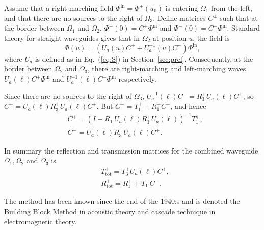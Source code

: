 \documentclass{svjour3}
\renewcommand{\Phi}{\varPhi}
\renewcommand{\vec}[1]{\bm{#1}}
\renewcommand{\Phi}{\varPhi}
\newcommand{\Phiin}{\vec\Phi^{\text{in}}}
\newcommand{\Ttot}{T^+_{\text{tot}}}
\newcommand{\Rtot}{R^+_{\text{tot}}}
\begin{document}
Assume that a right-marching field $\Phiin=\vec\Phi^+(u_0)$ is
entering $\Omega_1$ from the left, and that there are no sources to
the right of $\Omega_3$. Define matrices $C^\pm$ such that at the
border between $\Omega_1$ and $\Omega_2$, $\vec\Phi^+(0)=C^+\Phiin$
and $\vec\Phi^-(0)=C^-\Phiin$. Standard theory for straight waveguides
gives that in $\Omega_2$ at position $u$, the field is
\begin{equation}
  \label{eq:midfield}
  \vec\Phi(u)=(U_a(u)C^++U_a^{-1}(u)C^-)\Phiin,
\end{equation}
where $U_a$ is defined as in Eq.~(\ref{eq:S}) in
Section~\ref{sec:prel}.  Consequently, at the border between
$\Omega_2$ and $\Omega_3$, there are right-marching and left-marching
waves $U_a(\ell)C^+\Phiin$ and $U_a^{-1}(\ell)C^-\Phiin$ respectively.

Since there are no sources to the right of $\Omega_3$,
$U_a^{-1}(\ell)C^-=R_3^{+}U_a(\ell)C^+$, so
$C^-=U_a(\ell)R_3^{+}U_a(\ell)C^+$. But $C^+=T_1^{+}+R_1^{-}C^-$, and
hence
\begin{equation}
  \label{eq:ABRtotTtot}
  \begin{split}
    &C^+=\left(I-R_1^{-}U_a(\ell)R_3^{+}U_a(\ell)\right)^{-1}T_1^{+},\\
    &C^-=U_a(\ell)R_3^{+}U_a(\ell)C^+.
  \end{split}
\end{equation}

In summary the reflection and transmission matrices for the combined
waveguide $\Omega_1, \Omega_2$ and $\Omega_3$ is
\begin{equation}
  \label{eq:ABRtotTtot2}
  \begin{split}
    &\Ttot=T_3^{+}U_a(\ell)C^+,\\
    &\Rtot=R_1^{+}+T_1^{-}C^-.
  \end{split}
\end{equation}

The method has been known since the end of the 1940:s \cite{kerns1949}
and is denoted the Building Block Method \cite{nilssonbrander1981b} in
acoustic theory and cascade technique \cite{jones1986} in
electromagnetic theory.
\end{document}
